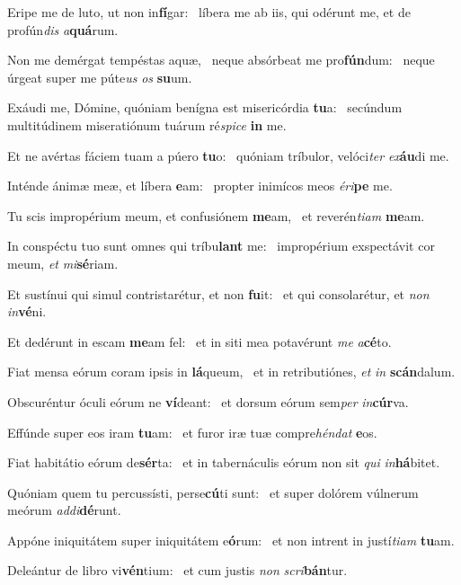 \item Eripe me de luto, ut non in\textbf{fí}gar:~\psstar{} líbera me ab iis, qui odérunt me, et de profún\textit{dis} \textit{a}\textbf{quá}rum.
\item Non me demérgat tempéstas aquæ,~\pscross{} neque absórbeat me pro\textbf{fún}dum:~\psstar{} neque úrgeat super me púte\textit{us} \textit{os} \textbf{su}um.
\item Exáudi me, Dómine, quóniam benígna est misericórdia \textbf{tu}a:~\psstar{} secúndum multitúdinem miseratiónum tuárum ré\textit{spice} \textbf{in} me.
\item Et ne avértas fáciem tuam a púero \textbf{tu}o:~\psstar{} quóniam tríbulor, velóci\textit{ter} \textit{ex}\textbf{áu}di me.
\item Inténde ánimæ meæ, et líbera \textbf{e}am:~\psstar{} propter inimícos meos \textit{éri}\textbf{pe} me.
\item Tu scis impropérium meum, et confusiónem \textbf{me}am,~\psstar{} et reverén\textit{tiam} \textbf{me}am.
\item In conspéctu tuo sunt omnes qui tríbu\textbf{lant} me:~\psstar{} impropérium exspectávit cor meum, \textit{et} \textit{mi}\textbf{sé}riam.
\item Et sustínui qui simul contristarétur, et non \textbf{fu}it:~\psstar{} et qui consolarétur, et \textit{non} \textit{in}\textbf{vé}ni.
\item Et dedérunt in escam \textbf{me}am fel:~\psstar{} et in siti mea potavérunt \textit{me} \textit{a}\textbf{cé}to.
\item Fiat mensa eórum coram ipsis in \textbf{lá}queum,~\psstar{} et in retributiónes, \textit{et} \textit{in} \textbf{scán}dalum.
\item Obscuréntur óculi eórum ne \textbf{ví}deant:~\psstar{} et dorsum eórum sem\textit{per} \textit{in}\textbf{cúr}va.
\item Effúnde super eos iram \textbf{tu}am:~\psstar{} et furor iræ tuæ compre\textit{héndat} \textbf{e}os.
\item Fiat habitátio eórum de\textbf{sér}ta:~\psstar{} et in tabernáculis eórum non sit \textit{qui} \textit{in}\textbf{há}bitet.
\item Quóniam quem tu percussísti, perse\textbf{cú}ti sunt:~\psstar{} et super dolórem vúlnerum meórum \textit{addi}\textbf{dé}runt.
\item Appóne iniquitátem super iniquitátem e\textbf{ó}rum:~\psstar{} et non intrent in justí\textit{tiam} \textbf{tu}am.
\item Deleántur de libro vi\textbf{vén}ti\-um:~\psstar{} et cum justis \textit{non} \textit{scri}\textbf{bán}tur.
